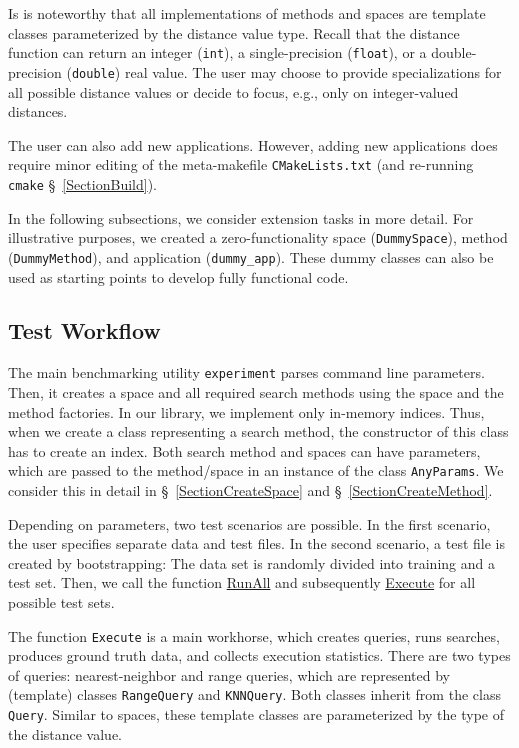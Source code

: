 \documentclass[runningheads,a4paper]{llncs}
\newcommand{\ttt}[1]{\texttt{#1}}
\begin{document}
{Is is noteworthy that all implementations of methods and spaces
are template classes parameterized by the distance value type.
Recall that the distance function can return an integer (\ttt{int}), 
a single-precision (\ttt{float}), or a double-precision (\ttt{double}) real value.
The user may choose to provide specializations for all possible
distance values or decide to focus, e.g., only on integer-valued distances.

The user can also add new applications.
However, adding new applications does require minor editing of the meta-makefile \ttt{CMakeLists.txt} 
(and re-running \ttt{cmake} \S~\ref{SectionBuild}).

In the following subsections, 
we consider extension tasks in more detail.
For illustrative purposes,
we created a zero-functionality space (\texttt{DummySpace}), 
method (\texttt{DummyMethod}), and application (\texttt{dummy\_app}).
These dummy classes can also be used as starting points to develop fully functional code.

\subsection{Test Workflow}\label{SectionWorkflow}
The main benchmarking utility \ttt{experiment} parses command line parameters. 
Then, it creates a space and all required search methods using
the space and the method factories.
In our library, we implement only in-memory indices.
Thus, when we create a class representing a search method,
the constructor of this class has to create an index.
Both search method and spaces can have parameters,
which are passed to the method/space in an instance
of the class \ttt{AnyParams}.
We consider this in detail in \S~\ref{SectionCreateSpace} and \S~\ref{SectionCreateMethod}.

Depending on parameters, two test scenarios are possible.
In the first scenario, the user specifies separate data and test files.
In the second scenario, a test file is created by bootstrapping:
The data set is randomly divided into training and a test set.
Then,
we call the function \href{https://github.com/searchivarius/NonMetricSpaceLib/blob/master/similarity_search/include/experiments.h#L93}{RunAll} 
and subsequently \href{https://github.com/searchivarius/NonMetricSpaceLib/blob/master/similarity_search/include/experiments.h#L221}{Execute} for all possible test sets.

The function \ttt{Execute} is a main workhorse, which creates queries, runs searches,
produces ground truth data, and collects execution statistics.
There are two types of queries: nearest-neighbor and range queries,
which are represented by (template) classes \ttt{RangeQuery} and \ttt{KNNQuery}.
Both classes inherit from the class \ttt{Query}.
Similar to spaces, these template classes are parameterized by the type of the distance value.

}
\end{document}

